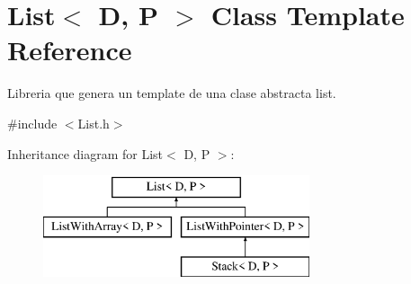 \hypertarget{class_list}{\section{List$<$ D, P $>$ Class Template Reference}
\label{class_list}
}


Libreria que genera un template de una clase abstracta list.  




{\ttfamily \#include $<$List.\+h$>$}

Inheritance diagram for List$<$ D, P $>$\+:\begin{figure}[H]
\begin{center}
\leavevmode
\includegraphics[height=3.000000cm]{class_list}
\end{center}
\end{figure}
